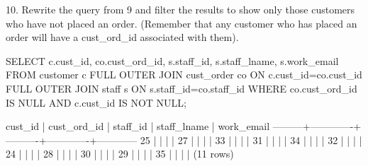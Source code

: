 10. Rewrite the query from 9 and filter the results to show only those customers who have not placed an order. (Remember that any customer who has placed an order will have a cust\_ord\_id associated with them).
\begin{sql}
SELECT c.cust_id, co.cust_ord_id, s.staff_id, s.staff_lname, s.work_email FROM customer c
FULL OUTER JOIN cust_order co ON c.cust_id=co.cust_id
FULL OUTER JOIN staff s ON s.staff_id=co.staff_id
WHERE co.cust_ord_id IS NULL AND c.cust_id IS NOT NULL;
\end{sql}
\begin{pseudo*}
 cust_id | cust_ord_id | staff_id | staff_lname | work_email
---------+-------------+----------+-------------+------------
      25 |             |          |             |
      27 |             |          |             |
      33 |             |          |             |
      31 |             |          |             |
      34 |             |          |             |
      32 |             |          |             |
      24 |             |          |             |
      28 |             |          |             |
      30 |             |          |             |
      29 |             |          |             |
      35 |             |          |             |
(11 rows)
\end{pseudo*}

